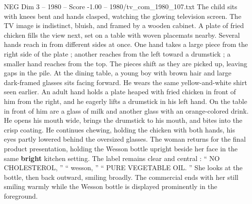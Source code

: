 \begin{textsample}{NEG Dim 3 – 1980 – Score -1.00 – 1980/tv\_com\_1980\_107.txt}
The child sits with knees bent and hands clasped, watching the glowing television screen.
The TV image is indistinct, bluish, and framed by a wooden cabinet.
A plate of fried chicken fills the view next, set on a table with woven placemats nearby.
Several hands reach in from different sides at once.
One hand takes a large piece from the right side of the plate ; another reaches from the left toward a drumstick ; a smaller hand reaches from the top.
The pieces shift as they are picked up, leaving gaps in the pile.
At the dining table, a young boy with brown hair and large dark-framed glasses sits facing forward.
He wears the same yellow-and-white shirt seen earlier.
An adult hand holds a plate heaped with fried chicken in front of him from the right, and he eagerly lifts a drumstick in his left hand.
On the table in front of him are a glass of milk and another glass with an orange-colored drink.
He opens his mouth wide, brings the drumstick to his mouth, and bites into the crisp coating.
He continues chewing, holding the chicken with both hands, his eyes partly lowered behind the oversized glasses.
The woman returns for the final product presentation, holding the Wesson bottle upright beside her face in the same \textbf{bright} kitchen setting.
The label remains clear and central : “ NO CHOLESTEROL, ” “ wesson, ” “ PURE VEGETABLE OIL. ” She looks at the bottle, then back outward, smiling broadly.
The commercial ends with her still smiling warmly while the Wesson bottle is displayed prominently in the foreground.

\end{textsample}
